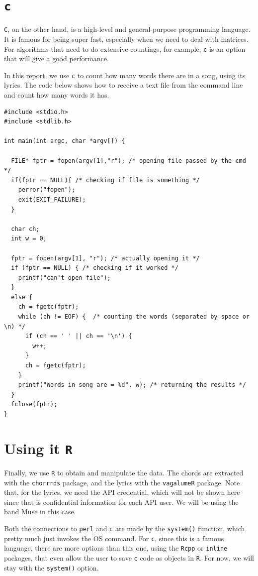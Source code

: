 \documentclass[]{article}
\begin{document}
\hypertarget{c}{%
\section{\texorpdfstring{\texttt{c}}{c}}\label{c}}

\texttt{C}, on the other hand, is a high-level and general-purpose
programming language. It is famous for being super fast, especially when
we need to deal with matrices. For algorithms that need to do extensive
countings, for example, \texttt{c} is an option that will give a good
performance.

In this report, we use \texttt{c} to count how many words there are in a
song, using its lyrics. The code below shows how to receive a text file
from the command line and count how many words it has.

\begin{verbatim}
#include <stdio.h>
#include <stdlib.h>

int main(int argc, char *argv[]) {

  FILE* fptr = fopen(argv[1],"r"); /* opening file passed by the cmd */
  if(fptr == NULL){ /* checking if file is something */
    perror("fopen");
    exit(EXIT_FAILURE);
  }

  char ch;
  int w = 0;

  fptr = fopen(argv[1], "r"); /* actually opening it */
  if (fptr == NULL) { /* checking if it worked */
    printf("can't open file");
  }
  else {
    ch = fgetc(fptr);
    while (ch != EOF) {  /* counting the words (separated by space or \n) */
      if (ch == ' ' || ch == '\n') {
        w++;
      }
      ch = fgetc(fptr);
    }
    printf("Words in song are = %d", w); /* returning the results */
  }
  fclose(fptr);
}
\end{verbatim}

\hypertarget{using-it-r}{%
\section{\texorpdfstring{Using it
\texttt{R}}{Using it R}}\label{using-it-r}}

Finally, we use \texttt{R} to obtain and manipulate the data. The chords
are extracted with the \texttt{chorrrds} package, and the lyrics with
the \texttt{vagalumeR} package. Note that, for the lyrics, we need the
API credential, which will not be shown here since that is confidential
information for each API user. We will be using the band Muse in this
case.

Both the connections to \texttt{perl} and \texttt{c} are made by the
\texttt{system()} function, which pretty much just invokes the OS
command. For \texttt{c}, since this is a famous language, there are more
options than this one, using the \texttt{Rcpp} or \texttt{inline}
packages, that even allow the user to save \texttt{c} code as objects in
\texttt{R}. For now, we will stay with the \texttt{system()} option.
\end{document}
